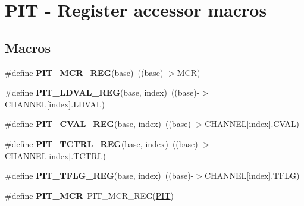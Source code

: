 \hypertarget{group__PIT__Register__Accessor__Macros}{}\section{P\+IT -\/ Register accessor macros}
\label{group__PIT__Register__Accessor__Macros}
\subsection*{Macros}
\begin{DoxyCompactItemize}
\item 
\#define {\bfseries P\+I\+T\+\_\+\+M\+C\+R\+\_\+\+R\+EG}(base)~((base)-\/$>$M\+CR)\hypertarget{group__PIT__Register__Accessor__Macros_ga01f1ee5f7f451b1f6f7f1b3549c63303}{}\label{group__PIT__Register__Accessor__Macros_ga01f1ee5f7f451b1f6f7f1b3549c63303}

\item 
\#define {\bfseries P\+I\+T\+\_\+\+L\+D\+V\+A\+L\+\_\+\+R\+EG}(base,  index)~((base)-\/$>$C\+H\+A\+N\+N\+EL\mbox{[}index\mbox{]}.L\+D\+V\+AL)\hypertarget{group__PIT__Register__Accessor__Macros_gaa1c49ea81e45e7ae3407b2b804432381}{}\label{group__PIT__Register__Accessor__Macros_gaa1c49ea81e45e7ae3407b2b804432381}

\item 
\#define {\bfseries P\+I\+T\+\_\+\+C\+V\+A\+L\+\_\+\+R\+EG}(base,  index)~((base)-\/$>$C\+H\+A\+N\+N\+EL\mbox{[}index\mbox{]}.C\+V\+AL)\hypertarget{group__PIT__Register__Accessor__Macros_gaac9edbb5229fcbcd8d71f5fdeab96590}{}\label{group__PIT__Register__Accessor__Macros_gaac9edbb5229fcbcd8d71f5fdeab96590}

\item 
\#define {\bfseries P\+I\+T\+\_\+\+T\+C\+T\+R\+L\+\_\+\+R\+EG}(base,  index)~((base)-\/$>$C\+H\+A\+N\+N\+EL\mbox{[}index\mbox{]}.T\+C\+T\+RL)\hypertarget{group__PIT__Register__Accessor__Macros_gaa338edf83b961108a6dcdd43c80ed8c6}{}\label{group__PIT__Register__Accessor__Macros_gaa338edf83b961108a6dcdd43c80ed8c6}

\item 
\#define {\bfseries P\+I\+T\+\_\+\+T\+F\+L\+G\+\_\+\+R\+EG}(base,  index)~((base)-\/$>$C\+H\+A\+N\+N\+EL\mbox{[}index\mbox{]}.T\+F\+LG)\hypertarget{group__PIT__Register__Accessor__Macros_gae38fd2f9c8baca1504582bc5f3973932}{}\label{group__PIT__Register__Accessor__Macros_gae38fd2f9c8baca1504582bc5f3973932}

\item 
\#define {\bfseries P\+I\+T\+\_\+\+M\+CR}~P\+I\+T\+\_\+\+M\+C\+R\+\_\+\+R\+EG(\hyperlink{group__PIT__Peripheral__Access__Layer_gaf181c9e6602b6432a0bf1a9243808968}{P\+IT})\hypertarget{group__PIT__Register__Accessor__Macros_gad6118acee6a1de4d21ceaae97156642b}{}\label{group__PIT__Register__Accessor__Macros_gad6118acee6a1de4d21ceaae97156642b}


\end{DoxyCompactItemize}
